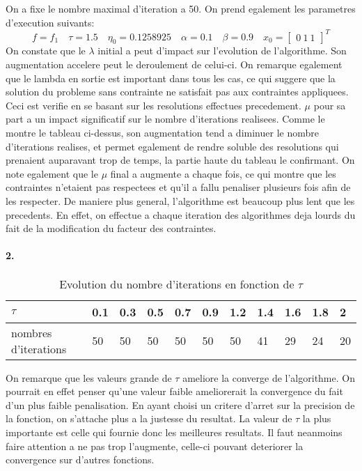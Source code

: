 \documentclass[12pt]{article}
\begin{document}
On a fixe le nombre maximal d'iteration a 50. On prend egalement les parametres d'execution suivants:
$$f = f_1 \quad \tau = 1.5 \quad \eta_0 = 0.1258925 \quad \alpha = 0.1 \quad \beta = 0.9 \quad x_0 = \left[\begin{array}{c}0\ 1\ 1\end{array}\right]^T$$ \newpage
On constate que le $\lambda$ initial a peut d'impact sur l'evolution de l'algorithme. Son augmentation accelere peut le deroulement de celui-ci. On remarque egalement que le lambda en sortie est important dans tous les cas, ce qui suggere que la solution du probleme sans contrainte ne satisfait pas aux contraintes appliquees. Ceci est verifie en se basant sur les resolutions effectues precedement.\newline
$\mu$ pour sa part a un impact significatif sur le nombre d'iterations realisees. Comme le montre le tableau ci-dessus, son augmentation tend a diminuer le nombre d'iterations realises, et permet egalement de rendre soluble des resolutions qui prenaient auparavant trop de temps, la partie haute du tableau le confirmant. On note egalement que le $\mu$ final a augmente a chaque fois, ce qui montre que les contraintes n'etaient pas respectees et qu'il a fallu penaliser plusieurs fois afin de les respecter.
\newline
De maniere plus general, l'algorithme est beaucoup plus lent que les precedents. En effet, on effectue a chaque iteration des algorithmes deja lourds du fait de la modification du facteur des contraintes.

\newpage
\paragraph{2.}
\begin{table}[]
\centering
\caption{Evolution du nombre d'iterations en fonction de $\tau$}
\label{my-label}
\begin{tabular}{|l|llllllllll}
\hline
$\tau$ & \multicolumn{1}{l|}{0.1} & \multicolumn{1}{l|}{0.3} & \multicolumn{1}{l|}{0.5} & \multicolumn{1}{l|}{0.7} & \multicolumn{1}{l|}{0.9} & \multicolumn{1}{l|}{1.2} & \multicolumn{1}{l|}{1.4} & \multicolumn{1}{l|}{1.6} & \multicolumn{1}{l|}{1.8} & \multicolumn{1}{l|}{2} \\ \hline
nombres d'iterations &50  &  50  &  50  &  50 &   50 &   50 &   41  &  29  &  24  &  20  \\ \cline{1-1}
\end{tabular}
\end{table}
On remarque que les valeurs grande de $\tau$ ameliore la converge de l'algorithme. On pourrait en effet penser qu'une valeur faible ameliorerait la convergence du fait d'un plus faible penalisation. En ayant choisi un critere d'arret sur la precision de la fonction, on s'attache plus a la justesse du resultat.\newline
La valeur de $\tau$ la plus importante est celle qui fournie donc les meilleures resultats. Il faut neanmoins faire attention a ne pas trop l'augmente, celle-ci pouvant deteriorer la convergence sur d'autres fonctions.
\end{document}
